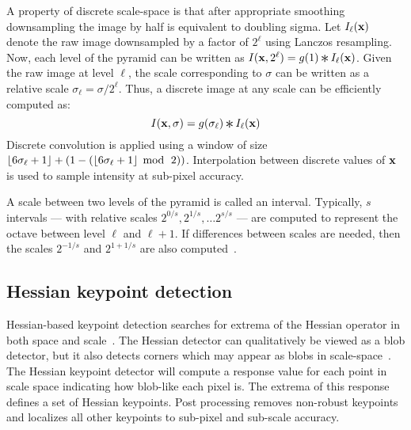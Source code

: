             A property of discrete scale-space is that after appropriate smoothing downsampling the image by half
            is equivalent to doubling sigma. Let
            $I_\ell(\mathbf{x})$ %
            denote the raw image downsampled by a factor of $2^{\ell}$ using Lanczos resampling. Now, each level of
            the pyramid can be written as %
            $\img(\pt, 2^\ell) = g( 1 ) \conv \img_\ell(\pt)$. 
            Given the raw image at level $\ell$, the scale
            corresponding to $\sigma$ can be written as a relative scale
            $\sigma_\ell = \sigma / 2^\ell$.
            Thus, a discrete image at any scale can be efficiently computed as:
            \begin{equation}
                \img(\pt, \sigma) =
                    g(\sigma_\ell) \conv \img_\ell(\pt)
            \end{equation}
            Discrete convolution is applied using a window of size
              $\left\lfloor{} 6\sigma_\ell + 1 \right\rfloor + (1 -
              (\left\lfloor{} 6\sigma_\ell + 1 \right\rfloor\; \operatorname{mod}{} \;\,2))$.
            Interpolation between discrete values of $\mathbf{x}$ is used to
              sample intensity at sub-pixel accuracy.

            A scale between two levels of the pyramid is called an interval. Typically, $s$ intervals --- with
            relative scales $2^{0/s}, 2^{1/s}, \ldots 2^{s/s}$ --- are computed to represent the octave between
            level $\ell$ and $\ell + 1$. If differences between scales are needed, then the scales $2^{-1/s}$ and
            $2^{1 + 1/s}$ are also computed~\cite{lowe_distinctive_2004}.

    \subsection{Hessian keypoint detection}

        Hessian-based keypoint detection searches for extrema of the Hessian operator in both space and
        scale~\cite{beaudet_rotationally_1978, lindeberg_shape_adapted_1994}. The Hessian detector can
        qualitatively be viewed as a blob detector, but it also detects corners which may appear as blobs in
        scale-space~\cite{tuytelaars_local_2008}. The Hessian keypoint detector will compute a response value for
        each point in scale space indicating how blob-like each pixel is. The extrema of this response defines a
        set of Hessian keypoints. Post processing removes non-robust keypoints and localizes all other keypoints to
        sub-pixel and sub-scale accuracy.

